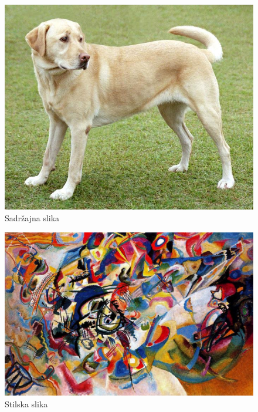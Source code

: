\documentclass[a4paper,12pt]{article}
\begin{document}
\begin{figure}[h]
\centering
\begin{minipage}{0.32\textwidth}
    \centering
    \includegraphics[width=\linewidth]{content_image.jpg}
    {Sadržajna slika}
\end{minipage}
\hfill
\begin{minipage}{0.32\textwidth}
    \centering
    \includegraphics[width=\linewidth]{style_image.jpg}
    {Stilska slika}
\end{minipage}
\hfill
\begin{minipage}{0.32\textwidth}
    \centering

\end{minipage}
\end{figure}
\end{document}
